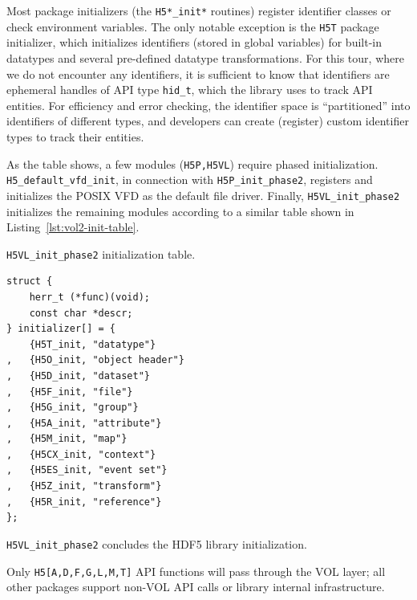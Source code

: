 Most package initializers (the \texttt{H5*\_init*} routines) register identifier classes or check environment variables. The only notable exception is the \texttt{H5T} package initializer, which initializes identifiers (stored in global variables) for built-in datatypes and several pre-defined datatype transformations. For this tour, where we do not encounter any identifiers, it is sufficient to know that identifiers are ephemeral handles of API type \texttt{hid\_t}, which the library uses to track API entities. For efficiency and error checking, the identifier space is ``partitioned'' into identifiers of different types, and developers can create (register) custom identifier types to track their entities.

As the table shows, a few modules (\texttt{H5P,H5VL}) require phased initialization. \texttt{H5\_default\_vfd\_init}, in connection with \texttt{H5P\_init\_phase2},  registers and initializes the POSIX VFD as the default file driver. Finally, \texttt{H5VL\_init\_phase2} initializes the remaining modules according to a similar table shown in Listing~\ref{lst:vol2-init-table}.

\begin{listing}
\centering
\caption{\texttt{H5VL\_init\_phase2} initialization table.}
\label{lst:vol2-init-table}
\begin{verbatim}
struct {
    herr_t (*func)(void);
    const char *descr;
} initializer[] = {
    {H5T_init, "datatype"}
,   {H5O_init, "object header"}
,   {H5D_init, "dataset"}
,   {H5F_init, "file"}
,   {H5G_init, "group"}
,   {H5A_init, "attribute"}
,   {H5M_init, "map"}
,   {H5CX_init, "context"}
,   {H5ES_init, "event set"}
,   {H5Z_init, "transform"}
,   {H5R_init, "reference"}
};
\end{verbatim}
\end{listing}

\texttt{H5VL\_init\_phase2} concludes the HDF5 library initialization.

Only \texttt{H5[A,D,F,G,L,M,T]} API functions will pass through the VOL layer; all other packages support non-VOL API calls or library internal infrastructure.

\noindent{}


